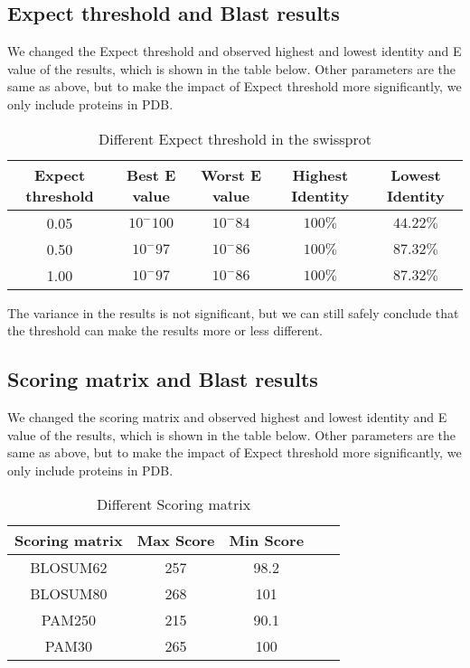 \documentclass[en,black,10pt,normal]{elegantnote}
\begin{document}
\subsection{Expect threshold and Blast results}
We changed the Expect threshold and observed highest and lowest identity and E value of the results,
which is shown in the table below. Other parameters are the same as above, 
but to make the impact of Expect threshold more significantly, we only include proteins in PDB.

\begin{table}[H]
    \caption{Different Expect threshold in the swissprot}
    \centering
    \begin{tabular}{ccccc}
        \toprule
        Expect threshold&Best E value&Worst E value&Highest Identity&Lowest Identity\\
        \midrule
        0.05&$10^-100$&$10^-84$&$100\%$&$44.22\%$\\
        0.50&$10^-97$&$10^-86$&$100\%$&$87.32\%$\\
        1.00&$10^-97$&$10^-86$&$100\%$&$87.32\%$\\
        \bottomrule
    \end{tabular}
\end{table}

The variance in the results is not significant, but we can still safely conclude that
the threshold can make the results more or less different.


\subsection{Scoring matrix and Blast results}

We changed the scoring matrix and observed highest and lowest identity and E value of the results,
which is shown in the table below.
Other parameters are the same as above, but to make the impact of Expect threshold more significantly, we only include proteins in PDB.


\begin{table}[H]
    \caption{Different Scoring matrix}
    \centering
    \begin{tabular}{ccccc}
        \toprule
        Scoring matrix&Max Score&Min Score\\
        \midrule
        BLOSUM62&257&98.2\\
        BLOSUM80&268&101\\
        PAM250&215&90.1\\
        PAM30&265&100\\
        \bottomrule
    \end{tabular}
\end{table}
\end{document}
